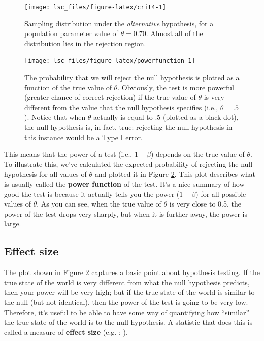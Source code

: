 \documentclass[
  11pt,
  a4paper,
  twoside,symmetric,openright]{book}
\theoremstyle{break}
\theoremstyle{break}
\begin{document}
\begin{figure}

{\centering \texttt{[image: lsc\_files/figure-latex/crit4-1]} 

}

\caption{Sampling distribution under the \emph{alternative} hypothesis, for a population parameter value of \(\theta = 0.70\). Almost all of the distribution lies in the rejection region.}\label{fig:crit4}
\end{figure}

\begin{figure}

{\centering \texttt{[image: lsc\_files/figure-latex/powerfunction-1]} 

}

\caption{The probability that we will reject the null hypothesis is plotted as a function of the true value of $\theta$. Obviously, the test is more powerful (greater chance of correct rejection) if the true value of $\theta$ is very different from the value that the null hypothesis specifies (i.e., $\theta=.5$). Notice that when $\theta$ actually is equal to .5 (plotted as a black dot), the null hypothesis is, in fact, true: rejecting the null hypothesis in this instance would be a Type I error.}\label{fig:powerfunction}
\end{figure}

This means that the power of a test (i.e., \(1-\beta\)) depends on the true value of \(\theta\). To illustrate this, we've calculated the expected probability of rejecting the null hypothesis for all values of \(\theta\) and plotted it in Figure \ref{fig:powerfunction}. This plot describes what is usually called the \textbf{power function} of the test. It's a nice summary of how good the test is because it actually tells you the power (\(1-\beta\)) for all possible values of \(\theta\). As you can see, when the true value of \(\theta\) is very close to 0.5, the power of the test drops very sharply, but when it is further away, the power is large.

\subsection{Effect size}\label{effect-size}

The plot shown in Figure \ref{fig:powerfunction} captures a basic point about hypothesis testing. If the true state of the world is very different from what the null hypothesis predicts, then your power will be very high; but if the true state of the world is similar to the null (but not identical), then the power of the test is going to be very low. Therefore, it's useful to be able to have some way of quantifying how ``similar'' the true state of the world is to the null hypothesis. A statistic that does this is called a measure of \textbf{effect size} (e.g. ; ).
\end{document}
